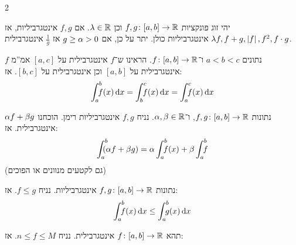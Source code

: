 \documentclass[]{../../../tex/classes/styledArticle}
\begin{document}
\begin{multicols}{2}
			\begin{Theorem}
				יהי זוג פונקציות $f, g \colon [a, b] \to \mathbb{R}$ וכן $\lambda \in \mathbb{R}$. אם $f, g$ אינטגרביליות, אז $\lambda f, f + g, \left \lvert f \right \rvert, f^{2}, f \cdot g$ אינטגרביליות כולן. יתר על כן, אם $ g \ge \alpha >0$ אז $\frac{1}{g}$ אינטגרבילית.
			\end{Theorem}
			\begin{Theorem}
				נתונים $a < b < c$ ו־$f \colon [a, b] \to \mathbb{R}$. הראינו ש־$f$ אינטגרבילית על $[a, c]$ אמ''מ $f$ אינטגרבילית על $[a, b]$ וכן אינטגרבילית על $[b, c]$. אז:
				\[ \int^{b}_a\dequad \ f(x) \dx = \int^c_b\dequad \  f(x) \dx = \int^c_a\dequad \  f(x) \dx \]
			\end{Theorem}
			\begin{Theorem}
				נתונות $f, g \colon [a, b] \to \mathbb{R}$, ו־$\alpha, \beta \in \mathbb{R}$. נניח $f, g$ אינטגרביליות רימן. הוכחנו $\alpha f + \beta g $ אינטגרבילית. אז:
				\[ \int^{b}_a \dequad \ (\ag f + \bg g) = \ag \int^b_a \dequad \ f(x) + \bg \int^b_a \dequad \ f \]
				(גם לקטעים מנוונים או הפוכים)
			\end{Theorem}
			\begin{Theorem}
				נתונות $f, g \colon [a, b] \to \mathbb{R}$ אינטגרביליות. נניח $f \le g$. אז:
				\[ \int^b_a \dequad \ f(x) \dx \le \int^b_a \dequad \ g(x) \dx \]
			\end{Theorem}
			\begin{Theorem}
				תהא $f \colon [a, b] \to \mathbb{R}$ אינטגרבילית. נניח $n \le f \le M$. אז:
				\begin{enumerate}

\end{enumerate}
\end{Theorem}
\end{multicols}
\end{document}

